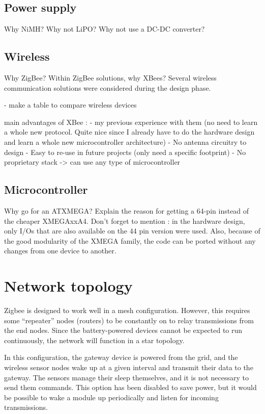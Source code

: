 \subsection{Power supply}
Why NiMH? Why not LiPO? Why not use a DC-DC converter?

\subsection{Wireless}
Why ZigBee? Within ZigBee solutions, why XBees?
Several wireless communication solutions were considered during the design
phase. 

- make a table to compare wireless devices

main advantages of XBee : 
- my previous experience with them (no need to learn a
  whole new protocol. Quite nice since I already have to do the hardware design
  and learn a whole new microcontroller architecture)
- No antenna circuitry to design
- Easy to re-use in future projects (only need a specific footprint)
- No proprietary stack -> can use any type of microcontroller

\subsection{Microcontroller}
Why go for an ATXMEGA?
Explain the reason for getting a 64-pin instead of the cheaper XMEGAxxA4.
Don't forget to mention : in the hardware design, only I/Os that are also
available on the 44 pin version were used. Also, because of the good modularity
of the XMEGA family, the code can be ported without any changes from one device
to another.


\section{Network topology}

Zigbee is designed to work well in a mesh configuration. However, this requires
some ``repeater'' nodes (routers) to be constantly on to relay transmissions
from the end nodes. Since the battery-powered devices cannot be expected to run
continuously, the network will function in a star topology.

In this configuration, the gateway device is powered from the grid, and the
wireless sensor nodes wake up at a given interval and transmit their data to the
gateway. The sensors manage their sleep themselves, and it is not necessary to
send them commands. This option has been disabled to save power, but it would be
possible to wake a module up periodically and listen for incoming transmissions.

